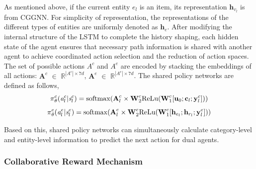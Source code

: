 \documentclass[conference]{IEEEtran}
\begin{document}
As mentioned above, if the current entity $e_l$ is an item, its representation $\textbf{h}_{v_l}$ is from CGGNN. For simplicity of representation, the representations of the different types of entities are uniformly denoted as $\textbf{h}_e$.
After modifying the internal structure of the LSTM to complete the history shaping, each hidden state of the agent ensures that necessary path information is shared with another agent to achieve coordinated action selection and the reduction of action spaces.
The set of possible actions $A^c$ and $A^e$ are encoded by stacking the embeddings of all actions: $\textbf{A}^c$ $\in$ $\mathbb{R}^{\left| A^c \right| \times 7d}$, $\textbf{A}^e$ $\in$ $\mathbb{R}^{\left| A^e \right| \times 7d}$. The shared policy networks are defined as follows,
\begin{equation}
    \emph{$\pi$}_\theta^{c}(\emph{a}_l^c|\emph{s}_l^c) =  \mathrm {softmax} (\textbf{A}_{l}^c\times \textbf{W}_{2}^c\text{ReLu}(\textbf{W}_{1}^c[\textbf{u}_0; \textbf{c}_l;\textbf{y}_l^c]))
\end{equation}
\begin{equation}
    \emph{$\pi$}_\theta^{e}(\emph{a}_l^e|\emph{s}_l^e) = \mathrm { softmax} (\textbf{A}_{l}^e\times \textbf{W}_{2}^e\text{ReLu}(\textbf{W}_{1}^e[\textbf{h}_{e_l};\textbf{h}_{r_l};\textbf{y}_l^e]))
\end{equation}

Based on this, shared policy networks can  simultaneously calculate  category-level and entity-level information to predict the next action for dual agents.


\subsubsection{Collaborative Reward Mechanism}
\end{document}
